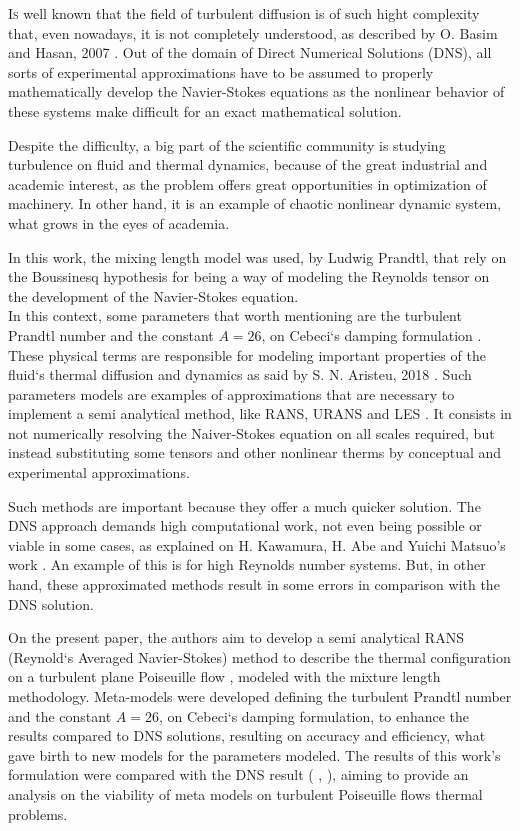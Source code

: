 \documentclass[10pt]{article} %
\begin{document}
\lettrine[nindent=0em,lines=2]{I}s well known that the field of turbulent diffusion is of such hight complexity that, even nowadays, it is not completely understood, as described by O. Basim and Hasan, 2007 \cite{hasan}. Out of the domain of Direct Numerical Solutions (DNS), all sorts of experimental approximations have to be assumed to properly mathematically develop the Navier-Stokes equations as the nonlinear behavior of these systems \cite{John} make difficult for an exact mathematical solution. 

Despite the difficulty, a big part of the scientific community is studying turbulence on fluid and thermal dynamics, because of the great industrial and academic interest, as the problem offers great opportunities in optimization of machinery. In other hand, it is an example of chaotic nonlinear dynamic system, what grows in the eyes of academia.   

In this work, the mixing length model was used, by Ludwig Prandtl, that rely on the Boussinesq hypothesis for being a way of modeling the Reynolds tensor on the development of the Navier-Stokes equation.\\ 

In this context, some parameters that worth mentioning are the turbulent Prandtl number \cite{Prandtl} and the constant $A = 26$, on Cebeci`s damping formulation \cite{Cebeci}. These physical terms are responsible for modeling important properties of the fluid`s thermal diffusion and dynamics as said by S. N. Aristeu, 2018 \cite{aristeu}. Such parameters models are examples of approximations that are necessary to implement a semi analytical method, like RANS, URANS and LES \cite{aristeu}. It consists in not numerically resolving the Naiver-Stokes equation on all scales required, but instead substituting some tensors and other nonlinear therms by conceptual and experimental approximations.

Such methods are important because they offer a much quicker solution. The DNS approach demands high computational work, not even being possible or viable in some cases, as explained on H. Kawamura, H. Abe and Yuichi Matsuo's work \cite{Abe}. An example of this is for high Reynolds number systems. But, in other hand, these approximated methods result in some errors in comparison with the DNS solution.    

On the present paper, the authors aim to develop a semi analytical RANS (Reynold`s Averaged Navier-Stokes) method to describe the thermal configuration on a turbulent plane Poiseuille flow \cite{Poiseuille}, modeled with the mixture length methodology. Meta-models were developed defining the turbulent Prandtl number \cite{Prandtl} and the constant $A = 26$, on Cebeci`s damping formulation, to enhance the results compared to DNS solutions, resulting on accuracy and efficiency, what gave birth to new models for the parameters modeled. The results of this work's formulation were compared with the DNS result (\cite{DNS1020} , \cite{DNS150}), aiming to provide an analysis on the viability of meta models on turbulent Poiseuille flows thermal problems. \\       
 
\end{document}
